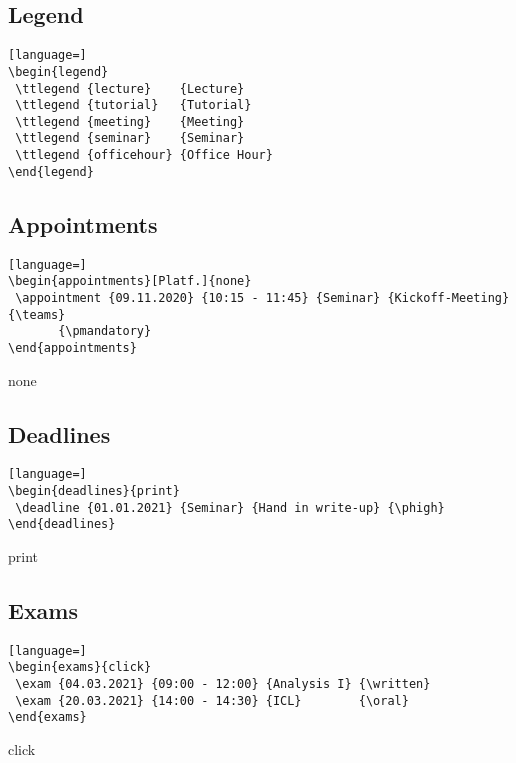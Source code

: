 \documentclass[english]{article}
\begin{document}
	\pagebreak
	\subsection{Legend}
	\begin{lstlisting}[language=]
\begin{legend}
 \ttlegend {lecture}    {Lecture}
 \ttlegend {tutorial}   {Tutorial}
 \ttlegend {meeting}    {Meeting}
 \ttlegend {seminar}    {Seminar}
 \ttlegend {officehour} {Office Hour}
\end{legend}		
	\end{lstlisting}
	\begin{legend}
	\end{legend}
	
	
	\subsection{Appointments}
	\begin{lstlisting}[language=]
\begin{appointments}[Platf.]{none}	
 \appointment {09.11.2020} {10:15 - 11:45} {Seminar} {Kickoff-Meeting} {\teams} 
       {\pmandatory} 
\end{appointments}
	\end{lstlisting}
	\begin{appointments}[Platf.]{none}	
	\end{appointments}


	\subsection{Deadlines}
	\begin{lstlisting}[language=]
\begin{deadlines}{print}
 \deadline {01.01.2021} {Seminar} {Hand in write-up} {\phigh}
\end{deadlines}
	\end{lstlisting}
	\begin{deadlines}{print}
	\end{deadlines}

	\subsection{Exams}
	\begin{lstlisting}[language=]
\begin{exams}{click}
 \exam {04.03.2021} {09:00 - 12:00} {Analysis I} {\written}
 \exam {20.03.2021} {14:00 - 14:30} {ICL}        {\oral}
\end{exams}
	\end{lstlisting}
	\begin{exams}{click}
	\end{exams}
\end{document}
